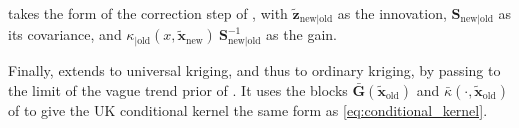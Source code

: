 \begin{remark}
	 takes the form of the correction step of , with $\tilde{\mathbf{z}}_{\mathrm{new}|\mathrm{old}}$ as the innovation, $\mathbf{S}_{\mathrm{new}|\mathrm{old}}$ as its covariance, and $\kappa_{|\mathrm{old}}(x,\tilde{\mathbf{x}}_{\mathrm{new}})\:\mathbf{S}_{\mathrm{new}|\mathrm{old}}^{-1}$ as the gain.
\end{remark}

Finally,  extends  to universal kriging, and thus to ordinary kriging, by passing to the limit of the vague trend prior of . It uses the blocks $\bar{\mathbf{G}}(\tilde{\mathbf{x}}_{\mathrm{old}})$ and $\bar{\kappa}(\cdot,\tilde{\mathbf{x}}_{\mathrm{old}})$ of  to give the UK conditional kernel the same form as \eqref{eq:conditional_kernel}.

